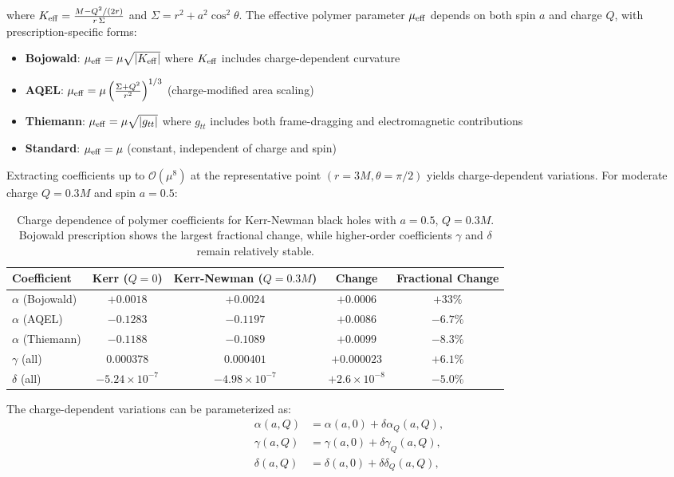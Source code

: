 \documentclass[11pt]{article}
\begin{document}
where $K_{\rm eff} = \frac{M - Q^2/(2r)}{r\,\Sigma}$ and $\Sigma = r^2 + a^2\cos^2\theta$. The effective polymer parameter $\mu_{\rm eff}$ depends on both spin $a$ and charge $Q$, with prescription-specific forms:

\begin{itemize}
\item \textbf{Bojowald}: $\mu_{\rm eff} = \mu \sqrt{|K_{\rm eff}|}$ where $K_{\rm eff}$ includes charge-dependent curvature
\item \textbf{AQEL}: $\mu_{\rm eff} = \mu \left(\frac{\Sigma + Q^2}{r^2}\right)^{1/3}$ (charge-modified area scaling)
\item \textbf{Thiemann}: $\mu_{\rm eff} = \mu \sqrt{|g_{tt}|}$ where $g_{tt}$ includes both frame-dragging and electromagnetic contributions
\item \textbf{Standard}: $\mu_{\rm eff} = \mu$ (constant, independent of charge and spin)
\end{itemize}

Extracting coefficients up to $\mathcal{O}(\mu^8)$ at the representative point $(r=3M, \theta=\pi/2)$ yields charge-dependent variations. For moderate charge $Q = 0.3M$ and spin $a = 0.5$:

\begin{table}[h]
\centering
\begin{tabular}{|l|c|c|c|c|}
\hline
\textbf{Coefficient} & \textbf{Kerr ($Q=0$)} & \textbf{Kerr-Newman ($Q=0.3M$)} & \textbf{Change} & \textbf{Fractional Change} \\
\hline
$\alpha$ (Bojowald) & $+0.0018$ & $+0.0024$ & $+0.0006$ & $+33\%$ \\
$\alpha$ (AQEL) & $-0.1283$ & $-0.1197$ & $+0.0086$ & $-6.7\%$ \\
$\alpha$ (Thiemann) & $-0.1188$ & $-0.1089$ & $+0.0099$ & $-8.3\%$ \\
$\gamma$ (all) & $0.000378$ & $0.000401$ & $+0.000023$ & $+6.1\%$ \\
$\delta$ (all) & $-5.24 \times 10^{-7}$ & $-4.98 \times 10^{-7}$ & $+2.6 \times 10^{-8}$ & $-5.0\%$ \\
\hline
\end{tabular}
\caption{Charge dependence of polymer coefficients for Kerr-Newman black holes with $a=0.5$, $Q=0.3M$. Bojowald prescription shows the largest fractional change, while higher-order coefficients $\gamma$ and $\delta$ remain relatively stable.}
\end{table}

The charge-dependent variations can be parameterized as:
\begin{align}
\alpha(a,Q) &= \alpha(a,0) + \delta\alpha_Q(a,Q), \\
\gamma(a,Q) &= \gamma(a,0) + \delta\gamma_Q(a,Q), \\
\delta(a,Q) &= \delta(a,0) + \delta\delta_Q(a,Q),
\end{align}
\end{document}
